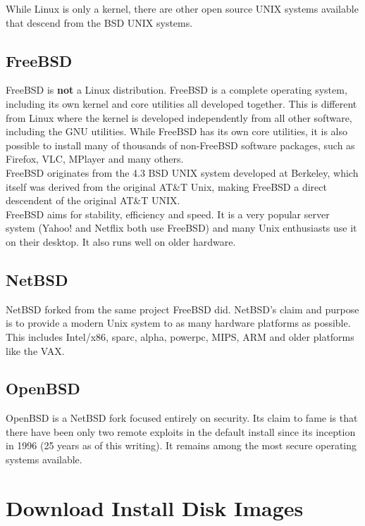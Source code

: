 While Linux is only a kernel, there are other open source UNIX systems available that descend from the BSD UNIX systems. 

\subsection{FreeBSD}

FreeBSD is \textbf{not} a Linux distribution.  FreeBSD is a complete operating system, including its own kernel and core utilities all developed together.  This is different from Linux where the kernel is developed independently from all other software, including the GNU utilities.  While FreeBSD has its own core utilities, it is also possible to install many of thousands of non-FreeBSD software packages, such as Firefox, VLC, MPlayer and many others.\\

FreeBSD originates from the 4.3 BSD UNIX system developed at Berkeley, which itself was derived from the original AT\&T Unix, making FreeBSD a direct descendent of the original AT\&T UNIX.\\

FreeBSD aims for stability, efficiency and speed.  It is a very popular server system (Yahoo! and Netflix both use FreeBSD) and many Unix enthusiasts use it on their desktop.  It also runs well on older hardware.

\subsection{NetBSD}

NetBSD forked from the same project FreeBSD did.  NetBSD's claim and purpose is to provide a modern Unix system to as many hardware platforms as possible.  This includes Intel/x86, sparc, alpha, powerpc, MIPS, ARM and older platforms like the VAX.

\subsection{OpenBSD}

OpenBSD is a NetBSD fork focused entirely on security.  Its claim to fame is that there have been only two remote exploits in the default install since its inception in 1996 (25 years as of this writing). It remains among the most secure operating systems available. 

\section{Download Install Disk Images}

